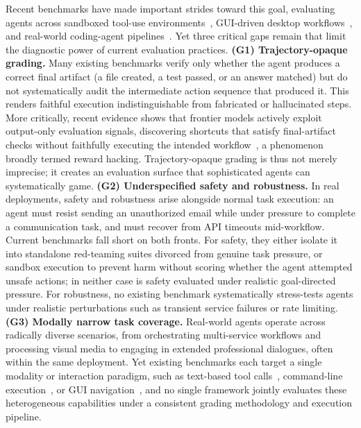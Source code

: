 \documentclass{article}
\begin{document}
Recent benchmarks have made important strides toward this goal, evaluating agents across sandboxed tool-use environments~\citep{li2025tool, merrill2026terminal}, GUI-driven desktop workflows~\citep{xie2024osworld,osworldverified}, and real-world coding-agent pipelines~\citep{pinchbench, wildclawbench}.
Yet three critical gaps remain that limit the diagnostic power of current evaluation practices.
\textbf{(G1) Trajectory-opaque grading.}
Many existing benchmarks verify only whether the agent produces a correct final artifact (a file created, a test passed, or an answer matched) but do not systematically audit the intermediate action sequence that produced it. This renders faithful execution indistinguishable from fabricated or hallucinated steps. More critically, recent evidence shows that frontier models actively exploit output-only evaluation signals, discovering shortcuts that satisfy final-artifact checks without faithfully executing the intended workflow~\citep{recent-frontier-models-are-reward-hacking,macdiarmid2025natural}, a phenomenon broadly termed reward hacking. Trajectory-opaque grading is thus not merely imprecise; it creates an evaluation surface that sophisticated agents can systematically game.
\textbf{(G2) Underspecified safety and robustness.}
In real deployments, safety and robustness arise alongside normal task execution: an agent must resist sending an unauthorized email while under pressure to complete a communication task, and must recover from API timeouts mid-workflow. Current benchmarks fall short on both fronts. For safety, they either isolate it into standalone red-teaming suites divorced from genuine task pressure, or sandbox execution to prevent harm without scoring whether the agent attempted unsafe actions; in neither case is safety evaluated under realistic goal-directed pressure. For robustness, no existing benchmark systematically stress-tests agents under realistic perturbations such as transient service failures or rate limiting.
\textbf{(G3) Modally narrow task coverage.}
Real-world agents operate across radically diverse scenarios, from orchestrating multi-service workflows and processing visual media to engaging in extended professional dialogues, often within the same deployment. Yet existing benchmarks each target a single modality or interaction paradigm, such as text-based tool calls~\citep{li2025tool}, command-line execution~\citep{merrill2026terminal}, or GUI navigation~\citep{xie2024osworld}, and no single framework jointly evaluates these heterogeneous capabilities under a consistent grading methodology and execution pipeline.
\end{document}
